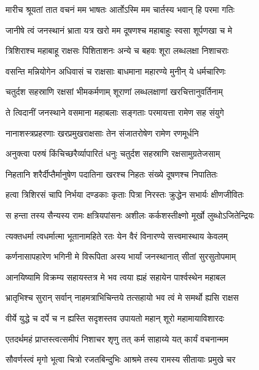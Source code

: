 
\twolineshloka
{मारीच श्रूयतां तात वचनं मम भाषतः}
{आर्तोऽस्मि मम चार्तस्य भवान् हि परमा गतिः} %

\twolineshloka
{जानीषे त्वं जनस्थानं भ्राता यत्र खरो मम}
{दूषणश्च महाबाहुः स्वसा शूर्पणखा च मे} %

\twolineshloka
{त्रिशिराश्च महाबाहू राक्षसः पिशिताशनः}
{अन्ये च बहवः शूरा लब्धलक्षा निशाचराः} %

\twolineshloka
{वसन्ति मन्नियोगेन अधिवासं च राक्षसाः}
{बाधमाना महारण्ये मुनीन् ये धर्मचारिणः} %

\twolineshloka
{चतुर्दश सहस्राणि रक्षसां भीमकर्मणाम्}
{शूराणां लब्धलक्षाणां खरचित्तानुवर्तिनाम्} %

\twolineshloka
{ते त्विदानीं जनस्थाने वसमाना महाबलाः}
{सङ्गताः परमायत्ता रामेण सह संयुगे} %

\twolineshloka
{नानाशस्त्रप्रहरणाः खरप्रमुखराक्षसाः}
{तेन संजातरोषेण रामेण रणमूर्धनि} %

\twolineshloka
{अनुक्त्वा परुषं किंचिच्छरैर्व्यापारितं धनुः}
{चतुर्दश सहस्राणि रक्षसामुग्रतेजसाम्} %

\twolineshloka
{निहतानि शरैर्दीप्तैर्मानुषेण पदातिना}
{खरश्च निहतः संख्ये दूषणश्च निपातितः} %

\twolineshloka
{हत्वा त्रिशिरसं चापि निर्भया दण्डकाः कृताः}
{पित्रा निरस्तः क्रुद्धेन सभार्यः क्षीणजीवितः} %

\twolineshloka
{स हन्ता तस्य सैन्यस्य रामः क्षत्रियपांसनः}
{अशीलः कर्कशस्तीक्ष्णो मूर्खो लुब्धोऽजितेन्द्रियः} %

\twolineshloka
{त्यक्तधर्मा त्वधर्मात्मा भूतानामहिते रतः}
{येन वैरं विनारण्ये सत्त्वमास्थाय केवलम्} %

\twolineshloka
{कर्णनासापहारेण भगिनी मे विरूपिता}
{अस्य भार्यां जनस्थानात् सीतां सुरसुतोपमाम्} %

\twolineshloka
{आनयिष्यामि विक्रम्य सहायस्तत्र मे भव}
{त्वया ह्यहं सहायेन पार्श्वस्थेन महाबल} %

\twolineshloka
{भ्रातृभिश्च सुरान् सर्वान् नाहमत्राभिचिन्तये}
{तत्सहायो भव त्वं मे समर्थो ह्यसि राक्षस} %

\twolineshloka
{वीर्ये युद्धे च दर्पे च न ह्यस्ति सदृशस्तव}
{उपायतो महान् शूरो महामायाविशारदः} %

\twolineshloka
{एतदर्थमहं प्राप्तस्त्वत्समीपं निशाचर}
{शृणु तत् कर्म साहाय्ये यत् कार्यं वचनान्मम} %

\twolineshloka
{सौवर्णस्त्वं मृगो भूत्वा चित्रो रजतबिन्दुभिः}
{आश्रमे तस्य रामस्य सीतायाः प्रमुखे चर} %

